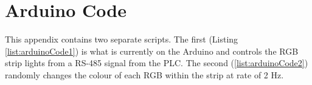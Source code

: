 \chapter{Arduino Code} \label{app:arduino}
    This appendix contains two separate scripts. The first (Listing \ref{list:arduinoCode1}) is what is currently on the Arduino and controls the RGB strip lights from a RS-485 signal from the PLC. The second (\ref{list:arduinoCode2}) randomly changes the colour of each RGB within the strip at rate of 2 Hz. 
    

    


